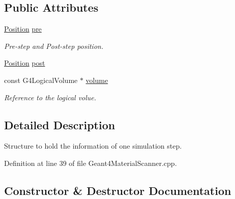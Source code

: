 \subsection*{Public Attributes}
\begin{DoxyCompactItemize}
\item 
\hyperlink{namespace_d_d4hep_1_1_geometry_a55083902099d03506c6db01b80404900}{Position} \hyperlink{class_d_d4hep_1_1_simulation_1_1_geant4_material_scanner_1_1_step_info_a8a5e62192e0103b052eb2c5885366aec}{pre}
\begin{DoxyCompactList}\small\item\em Pre-\/step and Post-\/step position. \end{DoxyCompactList}\item 
\hyperlink{namespace_d_d4hep_1_1_geometry_a55083902099d03506c6db01b80404900}{Position} \hyperlink{class_d_d4hep_1_1_simulation_1_1_geant4_material_scanner_1_1_step_info_a0fd16194cb4eeb622e8e1485d3881688}{post}
\item 
const G4\+Logical\+Volume $\ast$ \hyperlink{class_d_d4hep_1_1_simulation_1_1_geant4_material_scanner_1_1_step_info_ac413cc2216dfa5d0d174c48fd4acbe5b}{volume}
\begin{DoxyCompactList}\small\item\em Reference to the logical volue. \end{DoxyCompactList}\end{DoxyCompactItemize}


\subsection{Detailed Description}
Structure to hold the information of one simulation step. 

Definition at line 39 of file Geant4\+Material\+Scanner.\+cpp.



\subsection{Constructor \& Destructor Documentation}
\hypertarget{class_d_d4hep_1_1_simulation_1_1_geant4_material_scanner_1_1_step_info_a036a76d4b5c8de7d90d610417a7e2fa6}{}\label{class_d_d4hep_1_1_simulation_1_1_geant4_material_scanner_1_1_step_info_a036a76d4b5c8de7d90d610417a7e2fa6} 
